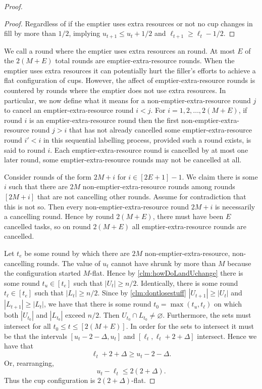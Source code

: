 \begin{proof}
\begin{proof}
    Regardless of if the emptier uses extra resources or not no
    cup changes in fill by more than $1/2$, implying $u_{t+1} \le
    u_t + 1/2$ and $\ell_{t+1} \ge \ell_t - 1/2$. 
  \end{proof}
  
  We call a round where the emptier uses extra resources an
   round. At most $E$ of the
  $2(M+E)$ total rounds are emptier-extra-resource rounds. When
  the emptier uses extra resources it can potentially hurt the
  filler's efforts to achieve a flat configuration of cups.
  However, the affect of emptier-extra-resource rounds is
  countered by rounds where the emptier does not use extra
  resources. In particular, we now define what it means for a
  non-emptier-extra-resource round $j$ to cancel an
  emptier-extra-resource round $i < j$. For $i = 1,2,\ldots,
  2(M+E)$, if round $i$ is an emptier-extra-resource round then
  the first non-emptier-extra-resource round $j > i$ that has not
  already cancelled some emptier-extra-resource round $i' < i$ in
  this sequential labelling process, provided such a round
  exists, is said to  round $i$. Each
  emptier-extra-resource round is cancelled by at most one later
  round, some emptier-extra-resource rounds may not be cancelled
  at all.

  Consider rounds of the form $2M + i$ for $i \in [2E+1]-1$. We
  claim there is some $i$ such that there are $2M$
  non-emptier-extra-resource rounds among rounds $[2M + i]$ that
  are not cancelling other rounds. Assume for contradiction that
  this is not so. Then every non-emptier-extra-resource round $2M + i$
  is necessarily a cancelling round. Hence by round $2(M + E)$,
  there must have been $E$ cancelled tasks, so on round $2(M+E)$
  all emptier-extra-resource rounds are cancelled.

  Let $t_e$ be some round by which there are $2M$
  non-emptier-extra-resource, non-cancelling rounds. The value of
  $u_t$ cannot have shrunk by more than $M$ because the
  configuration started $M$-flat. Hence by
  \cref{clm:howDoLandUchange} there is some round $t_u \in [t_e]$
  such that $|U_t|\ge n/2$. Identically, there is some round
  $t_\ell \in [t_e]$ such that $|L_t| \ge n/2$. Since by
  \cref{clm:dontlosestuff} $|U_{t+1}|\ge |U_t|$ and $|L_{t+1}|
  \ge |L_t|$, we have that there is some round $t_0 =\max(t_u,
  t_\ell)$ on which both $|U_{t_0}|$ and $|L_{t_0}|$ exceed
  $n/2$. Then $U_{t_0} \cap L_{t_0} \neq \varnothing$.
  Furthermore, the sets must intersect for all $t_0 \le t \le
  [2(M+E)]$. In order for the sets to intersect it must be that
  the intervals $[u_t-2-\Delta, u_t]$ and $[\ell_t,
  \ell_t+2+\Delta]$ intersect. Hence we have that
  $$\ell_t+2+\Delta \ge u_t-2-\Delta.$$ 
  Or, rearranging, 
  $$u_t - \ell_t \le 2(2+\Delta).$$ 
  Thus the cup configuration is $2(2+\Delta)$-flat.
\end{proof}

